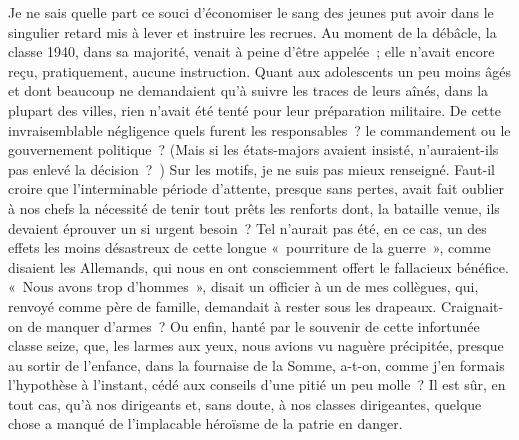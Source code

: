 \documentclass[french,twoside]{book} %
\begin{document}
Je ne sais quelle part ce souci d’économiser le sang des jeunes put avoir dans le singulier retard mis à lever et instruire les recrues. Au moment de la débâcle, la classe 1940, dans sa majorité, venait à peine d’être appelée ; elle n’avait encore reçu, pratiquement, aucune instruction. Quant aux adolescents un peu moins âgés et dont beaucoup ne demandaient qu’à suivre les traces de leurs aînés, dans la plupart des villes, rien n’avait été tenté pour leur préparation militaire. De cette invraisemblable négligence quels furent les responsables ? le   commandement ou le gouvernement politique ? (Mais si les états-majors avaient insisté, n’auraient-ils pas enlevé la décision ? ) Sur les motifs, je ne suis pas mieux renseigné. Faut-il croire que l’interminable période d’attente, presque sans pertes, avait fait oublier à nos chefs la nécessité de tenir tout prêts les renforts dont, la bataille venue, ils devaient éprouver un si urgent besoin ? Tel n’aurait pas été, en ce cas, un des effets les moins désastreux de cette longue « pourriture de la guerre », comme disaient les Allemands, qui nous en ont consciemment offert le fallacieux bénéfice. « Nous avons trop d’hommes », disait un officier à un de mes collègues, qui, renvoyé comme père de famille, demandait à rester sous les drapeaux. Craignait-on de manquer d’armes ? Ou enfin, hanté par le souvenir de cette infortunée classe seize, que, les larmes aux yeux, nous avions vu naguère précipitée, presque au sortir de l’enfance, dans la fournaise de la Somme, a-t-on, comme j’en formais l’hypothèse à l’instant, cédé aux conseils d’une pitié un peu molle ? Il est sûr, en tout cas, qu’à nos dirigeants et, sans doute, à nos classes dirigeantes, quelque chose a manqué de l’implacable héroïsme de la patrie en danger.\par
\end{document}
